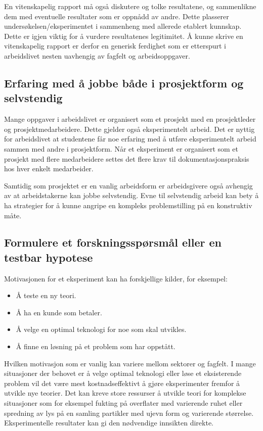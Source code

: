 \documentclass{article}
\begin{document}
En vitenskapelig rapport må også diskutere og tolke resultatene, og sammenlikne dem med eventuelle resultater som er oppnådd av andre.
Dette plasserer undersøkelsen/eksperimentet i sammenheng med allerede etablert kunnskap.
Dette er igjen viktig for å vurdere resultatenes legitimitet.
Å kunne skrive en vitenskapelig rapport er derfor en generisk ferdighet som er etterspurt i arbeidslivet nesten uavhengig av fagfelt og arbeidsoppgaver.


\subsection{Erfaring med å jobbe både i prosjektform og selvstendig}
Mange oppgaver i arbeidslivet er organisert som et prosjekt med en prosjektleder og prosjektmedarbeidere.
Dette gjelder også eksperimentelt arbeid.
Det er nyttig for arbeidslivet at studentene får noe erfaring med å utføre eksperimentelt arbeid sammen med andre i prosjektform.
Når et eksperiment er organisert som et prosjekt med flere medarbeidere settes det flere krav til dokumentasjonspraksis hos hver enkelt medarbeider.

Samtidig som prosjektet er en vanlig arbeidsform er arbeidsgivere også avhengig av at arbeidstakerne kan jobbe selvstendig.
Evne til selvstendig arbeid kan bety å ha strategier for å kunne angripe en kompleks problemstilling på en konstruktiv måte.

\subsection{Formulere et forskningsspørsmål eller en testbar hypotese}
Motivasjonen for et eksperiment kan ha forskjellige kilder, for eksempel:
\begin{itemize}
  \item Å teste en ny teori.
  \item Å ha en kunde som betaler.
  \item Å velge en optimal teknologi for noe som skal utvikles.
  \item Å finne en løsning på et problem som har oppstått.
\end{itemize}

Hvilken motivasjon som er vanlig kan variere mellom sektorer og fagfelt.
I mange situasjoner der behovet er å velge optimal teknologi eller løse et eksisterende problem vil det være mest kostnadseffektivt å gjøre eksperimenter fremfor å utvikle nye teorier.
Det kan kreve store ressurser å utvikle teori for komplekse situasjoner som for eksempel fukting på overflater med varierende ruhet eller spredning av lys på en samling partikler med ujevn form og varierende størrelse.
Eksperimentelle resultater kan gi den nødvendige innsikten direkte.
\end{document}
